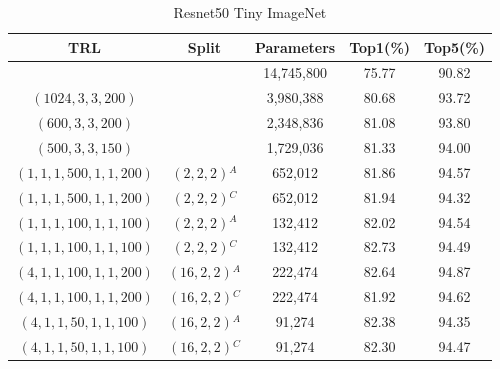 \documentclass{article}
\begin{document}
	
	\begin{table}
		\centering
		\begin{tabular}{c c c c c}
			\hline
			\textbf{TRL} & \textbf{Split} & \textbf{Parameters} & \textbf{Top1(\%)} & \textbf{Top5(\%)} \\
			\hline
			& & 14,745,800 & 75.77 & 90.82 \\
			$(1024,3,3,200)$ & & 3,980,388 & 80.68 & 93.72 \\
			$(600,3,3,200)$ & & 2,348,836 & 81.08 & 93.80 \\
			$(500,3,3,150)$ & & 1,729,036 & 81.33 & 94.00 \\
			$(1,1,1,500,1,1,200)$ & $(2,2,2)$$^A$ & 652,012 & 81.86 & 94.57 \\
			$(1,1,1,500,1,1,200)$ & $(2,2,2)$$^C$ & 652,012 & 81.94 & 94.32 \\
			$(1,1,1,100,1,1,100)$ & $(2,2,2)$$^A$ & 132,412 & 82.02 & 94.54 \\
			$(1,1,1,100,1,1,100)$ & $(2,2,2)$$^C$ & 132,412 & 82.73 & 94.49 \\
			$(4,1,1,100,1,1,200)$ & $(16,2,2)$$^A$ & 222,474 & 82.64 & 94.87 \\
			$(4,1,1,100,1,1,200)$ & $(16,2,2)$$^C$ & 222,474 & 81.92 & 94.62 \\
			$(4,1,1,50,1,1,100)$ & $(16,2,2)$$^A$ & 91,274 & 82.38 & 94.35 \\
			$(4,1,1,50,1,1,100)$ & $(16,2,2)$$^C$ & 91,274 & 82.30 & 94.47 \\
			\hline
		\end{tabular}
		\caption{Resnet50 Tiny ImageNet}
		\label{Resnet50 Tiny ImageNet}
	\end{table}
	
	
	
\end{document}
